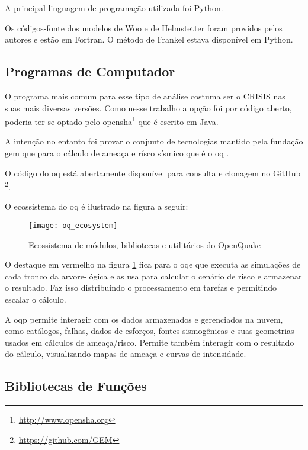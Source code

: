 A principal linguagem de programação utilizada foi Python.

Os códigos-fonte dos modelos de Woo e de Helmstetter foram providos pelos autores
e estão em Fortran. O método de Frankel estava disponível em Python.


\subsection{Programas de Computador}
\label{sec:software}

O programa mais comum para esse tipo de análise costuma ser o CRISIS \citep{crisis_2007} nas suas mais diversas
versões. Como nesse trabalho a opção foi por código aberto, poderia ter se optado pelo 
\gls{opensha}\footnote{\url{http://www.opensha.org}} que é escrito em Java.

A intenção no entanto foi provar o conjunto de tecnologias mantido pela fundação \gls{gem}
que para o cálculo de ameaça e rísco sísmico que é o \gls{oq} \citep{pagani_2014}.

O código do \gls{oq} está abertamente disponível para consulta e clonagem no GitHub
\footnote{\url{https://github.com/GEM}}.

O ecossistema do \gls{oq} é ilustrado na figura a seguir:

\begin{figure}[!h]
  \centering
  \texttt{[image: oq\_ecosystem]} 
  \caption{Ecossistema de módulos, bibliotecas e utilitários do OpenQuake}
  \label{fig:oq} 
\end{figure}

O destaque em vermelho na figura \ref{fig:oq} fica para o \gls{oqe} que executa as simulações de cada tronco da
arvore-lógica e as usa para calcular o cenário de risco e armazenar o resultado.
Faz isso distribuindo o processamento em tarefas e permitindo escalar o cálculo.

A \gls{oqp} permite interagir com os dados armazenados e gerenciados na nuvem, como catálogos, 
falhas, dados de esforços, fontes sismogênicas e suas geometrias usados em cálculos de ameaça/risco.
Permite também interagir com o resultado do cálculo, visualizando mapas de ameaça e curvas de intensidade.

\subsection{Bibliotecas de Funções}
\label{sec:bibliotecas}

